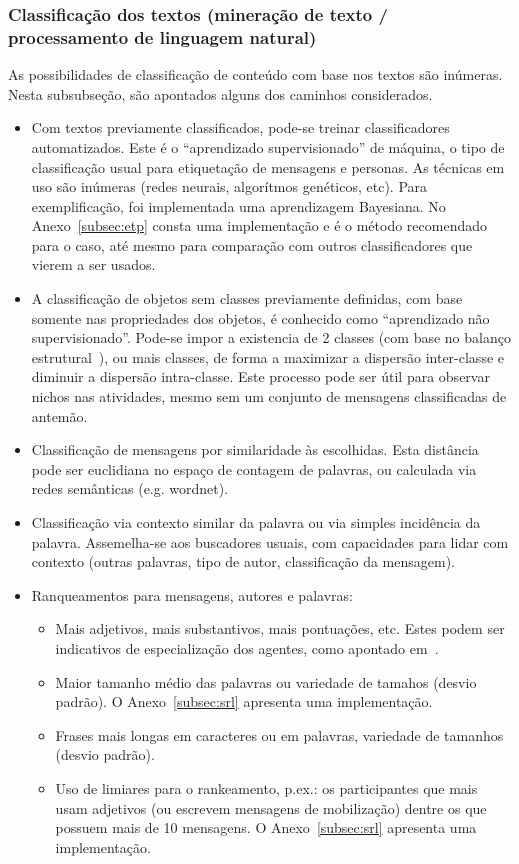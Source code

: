 \documentclass[12pt]{article}
\begin{document}
\subsubsection{Classificação dos textos (mineração de texto / processamento de linguagem natural)}
As possibilidades de classificação de conteúdo com base nos textos são inúmeras. Nesta subsubseção, são apontados alguns dos caminhos considerados.
\begin{itemize}
    \item Com textos previamente classificados, pode-se treinar classificadores automatizados. Este é o “aprendizado supervisionado” de máquina, o tipo de classificação usual para etiquetação de mensagens e personas. As técnicas em uso são inúmeras (redes neurais, algorítmos genéticos, etc). Para  exemplificação, foi implementada uma aprendizagem Bayesiana. No Anexo~\ref{subsec:etp} consta uma implementação e é o método recomendado para o caso, até mesmo para comparação com outros classificadores que vierem a ser usados.
    \item A classificação de objetos sem classes previamente definidas, com base somente nas propriedades dos objetos, é conhecido como ``aprendizado não supervisionado''. Pode-se impor a existencia de 2 classes (com base no balanço estrutural~\cite{easley}), ou mais classes, de forma a maximizar a dispersão inter-classe e diminuir a dispersão intra-classe. Este processo pode ser útil para observar nichos nas atividades, mesmo sem um conjunto de mensagens classificadas de antemão.
    \item Classificação de mensagens por similaridade às escolhidas. Esta distância pode ser euclidiana no espaço de contagem de palavras, ou calculada via redes semânticas (e.g. wordnet).
    \item Classificação via contexto similar da palavra ou via simples incidência da palavra. Assemelha-se aos buscadores usuais, com capacidades para lidar com contexto (outras palavras, tipo de autor, classificação da mensagem).
    \item Ranqueamentos para mensagens, autores e palavras:

\begin{itemize}
        \item Mais adjetivos, mais substantivos, mais pontuações, etc. Estes podem ser indicativos de especialização dos agentes, como apontado em~\cite{fabbri1, fabbri2}.
        \item Maior tamanho médio das palavras ou variedade de tamahos (desvio padrão). O Anexo~\ref{subsec:srl} apresenta uma implementação.
        \item Frases mais longas em caracteres ou em palavras, variedade de tamanhos (desvio padrão).
        \item Uso de limiares para o rankeamento, p.ex.: os participantes que mais usam adjetivos (ou escrevem mensagens de mobilização) dentre os que possuem mais de 10 mensagens. O Anexo~\ref{subsec:srl} apresenta uma implementação.
\end{itemize}
\end{itemize}
\end{document}
